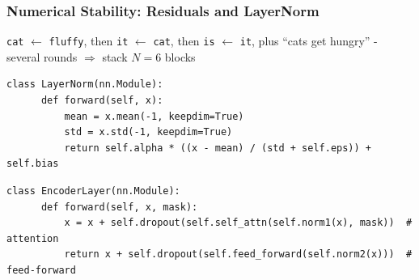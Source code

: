 \documentclass{beamer}
\newcommand{\sentnodes}[2][]{%
  \node[atok] (#20) {The};
  \node[atok=adjcolor, right=2pt of #20] (#21) {fluffy};
  \node[atok=catcolor, right=2pt of #21] (#22) {cat};
  \node[atok, right=2pt of #22] (#23) {eats};
  \node[atok=adjcolor, right=2pt of #23] (#24) {fresh};
  \node[atok=fishcolor, right=2pt of #24] (#25) {fish};
  \node[atok, right=2pt of #25] (#26) {because};
  \node[atok=itcolor, right=2pt of #26] (#27) {it};
  \node[atok, right=2pt of #27] (#28) {is};
  \node[atok, right=2pt of #28, #1] (#29) {hungry};
}
\begin{document}
\begin{frame}[fragile]
  \frametitle{Numerical Stability: Residuals and LayerNorm}
  \centering
  \par
  {\scriptsize \texttt{cat} $\leftarrow$ \texttt{fluffy}, then \texttt{it} $\leftarrow$ \texttt{cat}, then \texttt{is} $\leftarrow$ \texttt{it}, plus ``cats get hungry'' - several rounds $\Rightarrow$ stack $N = 6$ blocks\par}
  \vfill
  \begin{lstlisting}[basicstyle=\ttfamily\tiny]
  class LayerNorm(nn.Module):
      def forward(self, x):
          mean = x.mean(-1, keepdim=True)
          std = x.std(-1, keepdim=True)
          return self.alpha * ((x - mean) / (std + self.eps)) + self.bias
  \end{lstlisting}
  \begin{lstlisting}[basicstyle=\ttfamily\tiny]
  class EncoderLayer(nn.Module):
      def forward(self, x, mask):
          x = x + self.dropout(self.self_attn(self.norm1(x), mask))  # attention
          return x + self.dropout(self.feed_forward(self.norm2(x)))  # feed-forward
  \end{lstlisting}
\end{frame}
\end{document}
